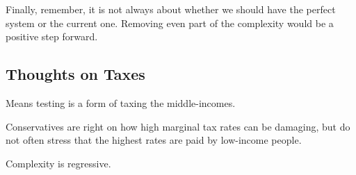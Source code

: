 Finally, remember, it is not always about whether we should have the perfect
system or the current one. Removing even part of the complexity would be a
positive step forward.

\subsection{Thoughts on Taxes}

\thought Means testing is a form of taxing the middle-incomes.

\thought Conservatives are right on how high marginal tax rates can be
damaging, but do not often stress that the highest rates are paid by low-income
people.

\thought Complexity is regressive.

